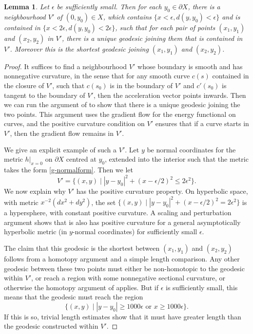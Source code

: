 \documentclass[10pt, a4paper, twoside]{amsart}
\numberwithin{equation}{section}
\newtheorem{lemma}[theorem]{Lemma}
\theoremstyle{remark}
\begin{document}
\begin{lemma}\label{lem:one}
Let $\epsilon$ be sufficiently small. Then for each $y_0 \in \partial X$, 
there is a neighbourhood $V'$ of $(0, y_0) \in X$, which contains 
$\{ x < \epsilon, d(y, y_0) < \epsilon \}$ and is contained in $\{ x < 2\epsilon, d(y, y_0) < 2\epsilon \}$, such that for each pair of points $(x_1, y_1)$ and $(x_2, y_2)$ in $V'$, there is a unique geodesic  joining them that is contained in $V'$. Moreover this is the shortest geodesic joining $(x_1, y_1)$ and $(x_2, y_2)$. 
\end{lemma}

\begin{proof}
It suffices to find a neighbourhood $V'$ whose boundary is smooth and has nonnegative curvature, in the sense that for any smooth curve $c(s)$ contained in the closure of $V'$, such that $c(s_0)$ is in the boundary of $V'$ and $c'(s_0)$ is tangent to the boundary of $V'$, then the acceleration vector points inwards. Then we can run the argument of \cite[Theorem 6.11.3]{Jost} to show that there is a unique geodesic joining the two points. This argument uses the gradient flow for the energy functional on curves, and the positive curvature condition on $V'$ ensures that if a curve starts in $V'$, then the gradient flow remains in $V'$. 

We give an explicit example of such a $V'$. Let $y$ be normal coordinates for the metric $h |_{x=0}$ on $\partial X$ centred at $y_0$, extended into the interior such that the metric takes the form \eqref{g-normalform}. Then we let 
$$
V'  =  \{ (x, y) \mid |y-y_0|^2 + (x - \epsilon/2)^2 \leq 2\epsilon^2 \}.
$$
We now explain why  $V'$ has the positive curvature property. On hyperbolic space, with metric $x^{-2}(dx^2 + dy^2)$, the set $\{ (x, y) \mid |y-y_0|^2 + (x - \epsilon/2)^2 = 2\epsilon^2\}$ is a hypersphere, with constant positive curvature. A scaling and perturbation argument shows that is also has positive curvature for a general asymptotically hyperbolic metric (in $y$-normal coordinates) for sufficiently small $\epsilon$. 

The claim that this geodesic is the shortest between $(x_1, y_1)$ and $(x_2, y_2)$ follows from a homotopy argument and a simple length comparison. Any other geodesic between these two points must either be non-homotopic to the geodesic within $V'$, or reach a region with some nonnegative sectional curvature, or otherwise the homotopy argument of \cite[Theorem 6.11.3]{Jost} applies. But
if $\epsilon$ is sufficiently small, this means that the geodesic must reach the region
$$
\{ (x, y) \mid |y - y_0| \geq 1000 \epsilon \text{ or } x \geq 1000\epsilon \}.
$$
If this is so, trivial length estimates show that it must have greater length than the geodesic constructed within $V'$.  \end{proof}
\end{document}
